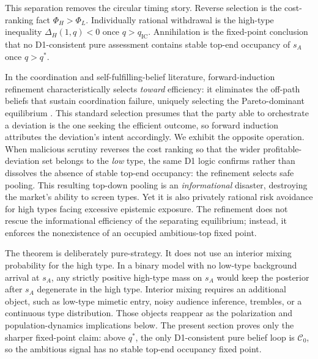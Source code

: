 This separation removes the circular timing story. Reverse selection is the cost-ranking fact \(\Phi_H>\Phi_L\). Individually rational withdrawal is the high-type inequality \(\Delta_H(1,q)<0\) once \(q>q_{\mathrm{IC}}\). Annihilation is the fixed-point conclusion that no D1-consistent pure assessment contains stable top-end occupancy of \(s_A\) once \(q>q^*\).

In the coordination and self-fulfilling-belief literature, forward-induction refinement characteristically selects \emph{toward} efficiency: it eliminates the off-path beliefs that sustain coordination failure, uniquely selecting the Pareto-dominant equilibrium \citep[e.g., the refinement resolutions of][]{diamond1983bank}. This standard selection presumes that the party able to orchestrate a deviation is the one seeking the efficient outcome, so forward induction attributes the deviation's intent accordingly. We exhibit the opposite operation. When malicious scrutiny reverses the cost ranking so that the wider profitable-deviation set belongs to the \emph{low} type, the same D1 logic confirms rather than dissolves the absence of stable top-end occupancy: the refinement selects safe pooling. This resulting top-down pooling is an \emph{informational} disaster, destroying the market's ability to screen types. Yet it is also privately rational risk avoidance for high types facing excessive epistemic exposure. The refinement does not rescue the informational efficiency of the separating equilibrium; instead, it enforces the nonexistence of an occupied ambitious-top fixed point.

The theorem is deliberately pure-strategy. It does not use an interior mixing probability for the high type. In a binary model with no low-type background arrival at \(s_A\), any strictly positive high-type mass on \(s_A\) would keep the posterior after \(s_A\) degenerate in the high type. Interior mixing requires an additional object, such as low-type mimetic entry, noisy audience inference, trembles, or a continuous type distribution. Those objects reappear as the polarization and population-dynamics implications below. The present section proves only the sharper fixed-point claim: above \(q^*\), the only D1-consistent pure belief loop is \(\mathcal C_0\), so the ambitious signal has no stable top-end occupancy fixed point.

